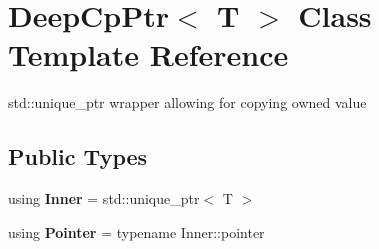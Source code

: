\hypertarget{structDeepCpPtr}{}\section{Deep\+Cp\+Ptr$<$ T $>$ Class Template Reference}
\label{structDeepCpPtr}


std\+::unique\+\_\+ptr wrapper allowing for copying owned value  


\subsection*{Public Types}
\begin{DoxyCompactItemize}
\item 
\mbox{\label{structDeepCpPtr_a1353ba6af6e86abbda8b35fe7c1643ac}} 
using {\bfseries Inner} = std\+::unique\+\_\+ptr$<$ T $>$
\item 
\mbox{\label{structDeepCpPtr_a5855c213fb5568dd644005beaead0a9e}} 
using {\bfseries Pointer} = typename Inner\+::pointer
\end{DoxyCompactItemize}
